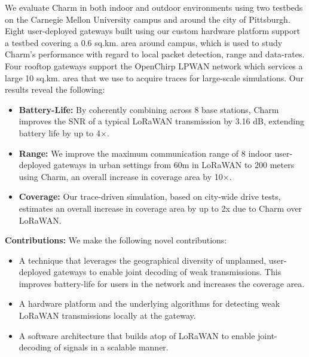 We evaluate Charm in both indoor and outdoor environments using two testbeds
on the Carnegie Mellon University campus and around the city of Pittsburgh.
Eight user-deployed gateways built using our custom hardware platform support
a testbed covering a 0.6 sq.km. area around campus, which is used to study
Charm's performance with regard to local packet detection, range and
data-rates. Four rooftop gateways support the OpenChirp LPWAN network which
services a large 10 sq.km. area that we use to acquire traces for large-scale
simulations. Our results reveal the following:

\begin{itemize}
    \item {\bf Battery-Life: } By coherently combining across 8 base stations,
        Charm improves the SNR of a typical LoRaWAN transmission by 3.16 dB,
        extending battery life by up to 4$\times$.
    \item {\bf Range: } We improve the maximum communication range of 8 indoor
        user-deployed gateways in urban settings from 60m in LoRaWAN to 200
        meters using Charm, an overall increase in coverage area by
        10$\times$.
    \item {\bf Coverage: } Our trace-driven simulation, based on city-wide
        drive tests, estimates an overall increase in coverage area by up to 2x due
        to Charm over LoRaWAN.
\end{itemize}

\noindent \textbf{Contributions:} We make the following novel contributions:
\begin{itemize}
    \item A technique that leverages the geographical diversity of unplanned,
        user-deployed gateways to enable joint decoding of weak transmissions.
        This improves battery-life for users in the network and increases the
        coverage area.
    \item A hardware platform and the underlying algorithms for detecting weak
        LoRaWAN transmissions locally at the gateway.
    \item A software architecture that builds atop of LoRaWAN to enable
        joint-decoding of signals in a scalable manner.
\end{itemize}